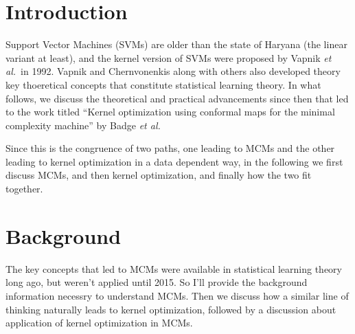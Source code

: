 \documentclass[11pt]{article}
\newcommand{\etal}{{\em et al.}}
\begin{document}


\section{Introduction}
Support Vector Machines (SVMs) are older than the state of Haryana (the linear variant at
least), and the kernel version of SVMs were proposed by Vapnik \etal\ in 1992. Vapnik and
Chernvonenkis along with others also developed theory key thoeretical concepts that
constitute statistical learning theory. In what follows, we discuss the theoretical
and practical advancements since then that led to the work titled ``Kernel optimization
using conformal maps for the minimal complexity machine'' by Badge \etal\par
Since this is the congruence of two paths, one leading to MCMs and the other leading to
kernel optimization in a data dependent way, in the following we first discuss MCMs, and
then kernel optimization, and finally how the two fit together.


\section{Background}
The key concepts that led to MCMs were available in statistical learning theory long ago,
but weren't applied until 2015. So I'll provide the background information
necessry to understand MCMs. Then we discuss how a similar line of thinking
naturally leads to kernel optimization, followed by a discussion about
application of kernel optimization in MCMs.
\end{document}
